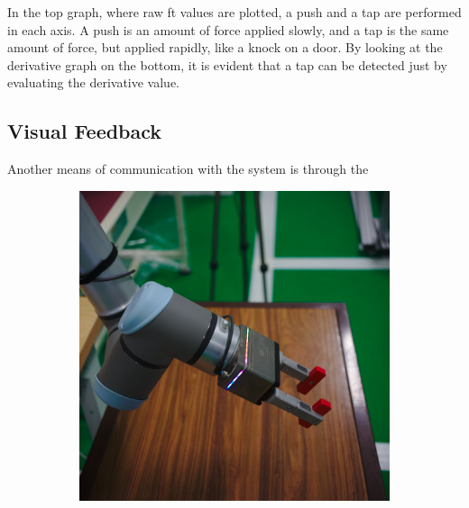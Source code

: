\par In the top graph, where raw \ac{ft} values are plotted, a push and a tap are performed in each axis. A push is an amount of force applied slowly, and a tap is the same amount of force, but applied rapidly, like a knock on a door. By looking at the derivative graph on the bottom, it is evident that a tap can be detected just by evaluating the derivative value. 


\subsection{Visual Feedback}

\par Another means of communication with the system is through the 

\begin{figure}[h]
    \centering
    \begin{subfigure}{.2\linewidth}
      \centering
      \includegraphics[width=.95\linewidth]{figs/chp5/grip_rgb.jpg}
    \end{subfigure}%
    \begin{subfigure}{.2\linewidth}
      \centering

\end{subfigure}
\end{figure}
